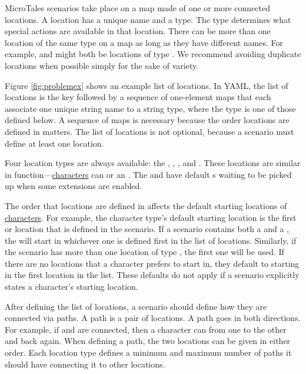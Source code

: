 \documentclass{nilreport}
\begin{document}
MicroTales scenarios take place on a map made of one or more connected locations. A location has a unique name and a type. The type determines what special actions are available in that location. There can be more than one location of the same type on a map as long as they have different names. For example,  and  might both be locations of type . We recommend avoiding duplicate locations when possible simply for the sake of variety.

Figure \ref{fig:problemex} shows an example list of locations. In YAML, the list of locations is the key  followed by a sequence of one-element maps that each associate one unique string name to a string type, where the type is one of those defined below. A sequence of maps is necessary because the order locations are defined in matters. The list of locations is not optional, because a scenario must define at least one location.

Four location types are always available: the , , , and . These locations are similar in function---\hyperref[sec:characters]{characters} can  or  an . The  and  have default s waiting to be picked up when some extensions are enabled.

The order that locations are defined in affects the default starting locations of \hyperref[sec:characters]{characters}. For example, the  character type's default starting location is the first  or  location that is defined in the scenario. If a scenario contains both a  and a , the  will start in whichever one is defined first in the list of locations. Similarly, if the scenario has more than one location of type , the first one will be used. If there are no locations that a character prefers to start in, they default to starting in the first location in the list. These defaults do not apply if a scenario explicitly states a character's starting location.

After defining the list of locations, a scenario should define how they are connected via paths. A path is a pair of locations. A path goes in both directions. For example, if  and  are connected, then a character can  from one to the other and back again. When defining a path, the two locations can be given in either order. Each location type defines a minimum and maximum number of paths it should have connecting it to other locations.
\end{document}
